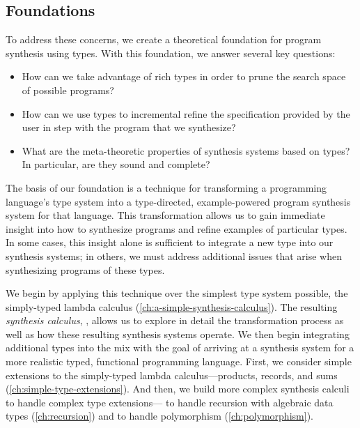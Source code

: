 \subsection{Foundations}
To address these concerns, we create a theoretical foundation for program synthesis using types.
With this foundation, we answer several key questions:
\begin{itemize}
  \item How can we take advantage of rich types in order to prune the search space of possible programs?
  \item How can we use types to incremental refine the specification provided by the user in step with the program that we synthesize?
  \item What are the meta-theoretic properties of synthesis systems based on types?  In particular, are they sound and complete?
\end{itemize}
The basis of our foundation is a technique for transforming a programming language's type system into a type-directed, example-powered program synthesis system for that language.
This transformation allows us to gain immediate insight into how to synthesize programs and refine examples of particular types.
In some cases, this insight alone is sufficient to integrate a new type into our synthesis systems; in others, we must address additional issues that arise when synthesizing programs of these types.

We begin by applying this technique over the simplest type system possible, the simply-typed lambda calculus (\autoref{ch:a-simple-synthesis-calculus}).
The resulting \emph{synthesis calculus}, \lsyn{}, allows us to explore in detail the transformation process as well as how these resulting synthesis systems operate.
We then begin integrating additional types into the mix with the goal of arriving at a synthesis system for a more realistic typed, functional programming language.
First, we consider simple extensions to the simply-typed lambda calculus---products, records, and sums (\autoref{ch:simple-type-extensions}).
And then, we build more complex synthesis calculi to handle complex type extensions---\mlsyn{} to handle recursion with algebraic data types (\autoref{ch:recursion}) and \systemfsyn{} to handle polymorphism (\autoref{ch:polymorphism}).

